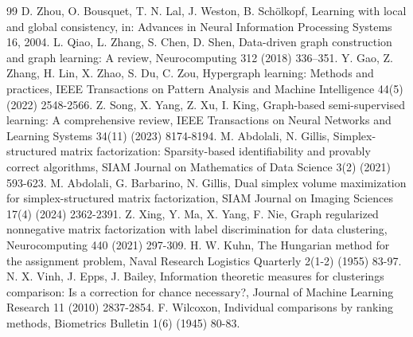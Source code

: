 \documentclass[a4paper,preprint,12pt]{elsarticle}
\theoremstyle{remark}
\begin{document}
\begin{thebibliography}{99}
 D. Zhou, O. Bousquet, T. N. Lal, J. Weston, B. Sch\"olkopf, Learning with local and global consistency, in: Advances in Neural Information Processing Systems 16, 2004.
 L. Qiao, L. Zhang, S. Chen, D. Shen, Data-driven graph construction and graph learning: A review, Neurocomputing 312 (2018) 336--351.
 Y. Gao, Z. Zhang, H. Lin, X. Zhao, S. Du, C. Zou, Hypergraph learning: Methods and practices, IEEE Transactions on Pattern Analysis and Machine Intelligence 44(5) (2022) 2548-2566.
 Z. Song, X. Yang, Z. Xu, I. King, Graph-based semi-supervised learning: A comprehensive review, IEEE Transactions on Neural Networks and Learning Systems 34(11) (2023) 8174-8194.
 M. Abdolali, N. Gillis, Simplex-structured matrix factorization: Sparsity-based identifiability and provably correct algorithms, SIAM Journal on Mathematics of Data Science 3(2) (2021) 593-623.
 M. Abdolali, G. Barbarino, N. Gillis, Dual simplex volume maximization for simplex-structured matrix factorization, SIAM Journal on Imaging Sciences 17(4) (2024) 2362-2391.
 Z. Xing, Y. Ma, X. Yang, F. Nie, Graph regularized nonnegative matrix factorization with label discrimination for data clustering, Neurocomputing 440 (2021) 297-309.
 H. W. Kuhn, The Hungarian method for the assignment problem, Naval Research Logistics Quarterly 2(1-2) (1955) 83-97.
 N. X. Vinh, J. Epps, J. Bailey, Information theoretic measures for clusterings comparison: Is a correction for chance necessary?, Journal of Machine Learning Research 11 (2010) 2837-2854.
 F. Wilcoxon, Individual comparisons by ranking methods, Biometrics Bulletin 1(6) (1945) 80-83.
\end{thebibliography}
\end{document}
